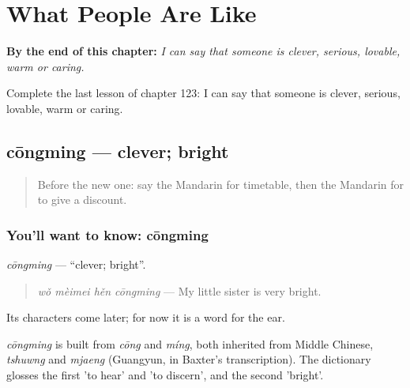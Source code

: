 
\chapter{What People Are Like}
\label{ch:zh-what-people-are-like}

\begin{chapteropening}
\textbf{By the end of this chapter:} \emph{I can say that someone is clever, serious, lovable, warm or caring.}

Complete the last lesson of chapter 123: I can say that someone is clever, serious, lovable, warm or caring.
\end{chapteropening}

\section[cōngming]{cōngming — clever; bright}

\label{lesson:ZH-C123-congming}



\begin{quote}
Before the new one: say the Mandarin for timetable, then the Mandarin for to give a discount.
\end{quote}

\subsection*{You'll want to know: cōngming}
\emph{cōngming} — \textquotedblleft{}clever; bright\textquotedblright{}.

\begin{quote}
\emph{wǒ mèimei hěn cōngming} — My little sister is very bright.
\end{quote}

Its characters come later; for now it is a word for the ear.

\begin{cousinweb}
\emph{cōngming} is built from \emph{cōng} and \emph{míng}, both inherited from Middle Chinese, \emph{tshuwng} and \emph{mjaeng} (Guangyun, in Baxter's transcription). The dictionary glosses the first 'to hear' and 'to discern', and the second 'bright'.
\end{cousinweb}

